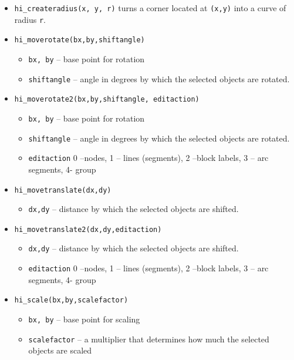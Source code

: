 \begin{itemize}
\item{\tt hi\_createradius(x, y, r)} turns a corner located at {\tt (x,y)} into a curve of radius {\tt r}.

\item{\tt hi\_moverotate(bx,by,shiftangle)}
        \begin{itemize}
        \item{\tt bx, by} -- base point for rotation
        \item{\tt shiftangle} -- angle in degrees by which the selected objects are rotated.
        \end{itemize}

\item{\tt hi\_moverotate2(bx,by,shiftangle, editaction)}
        \begin{itemize}
        \item{\tt bx, by} -- base point for rotation
        \item{\tt shiftangle} -- angle in degrees by which the selected objects are rotated.
        \item{\tt editaction}  0 --nodes, 1 -- lines (segments), 2 --block labels, 3 -- arc
                segments, 4- group
        \end{itemize}

\item{\tt hi\_movetranslate(dx,dy)}
        \begin{itemize}
        \item{\tt dx,dy} -- distance by which the selected objects are shifted.
        \end{itemize}

\item{\tt hi\_movetranslate2(dx,dy,editaction)}
        \begin{itemize}
        \item{\tt dx,dy} -- distance by which the selected objects are shifted.
        \item{\tt editaction}  0 --nodes, 1 -- lines (segments), 2 --block labels, 3 -- arc
                segments, 4- group
        \end{itemize}

\item{\tt hi\_scale(bx,by,scalefactor)}
        \begin{itemize}
        \item{\tt bx, by} -- base point for scaling
        \item{\tt scalefactor} -- a multiplier that determines how
        much the selected objects are scaled
        \end{itemize}


\end{itemize}
